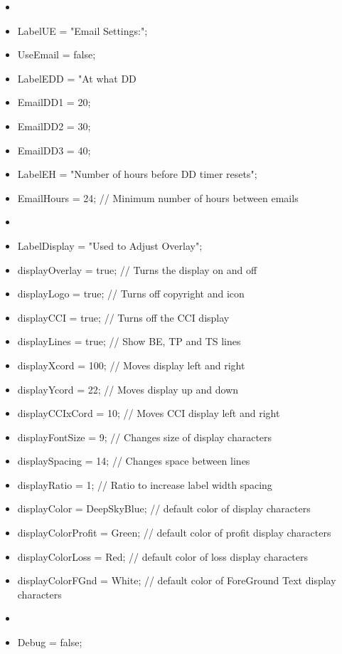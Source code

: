\begin{itemize}
\item 
\item LabelUE             = "Email Settings:";
\item UseEmail            = false;
\item LabelEDD            = "At what DD%
\item EmailDD1            = 20;
\item EmailDD2            = 30;
\item EmailDD3            = 40;
\item LabelEH             = "Number of hours before DD timer resets";
\item EmailHours          = 24;       // Minimum number of hours between emails
\item 
\item LabelDisplay        = "Used to Adjust Overlay";
\item displayOverlay      = true;     // Turns the display on and off
\item displayLogo         = true;     // Turns off copyright and icon
\item displayCCI          = true;     // Turns off the CCI display
\item displayLines        = true;     // Show BE, TP and TS lines
\item displayXcord        = 100;      // Moves display left and right
\item displayYcord        = 22;       // Moves display up and down
\item displayCCIxCord     = 10;       // Moves CCI display left and right 
\item displayFontSize     = 9;        // Changes size of display characters
\item displaySpacing      = 14;       // Changes space between lines
\item displayRatio        = 1;        // Ratio to increase label width spacing
\item displayColor        = DeepSkyBlue; // default color of display characters
\item displayColorProfit  = Green;    // default color of profit display characters
\item displayColorLoss    = Red;      // default color of loss display characters
\item displayColorFGnd    = White;    // default color of ForeGround Text display characters
\item 
\item Debug               = false;

\end{itemize}

